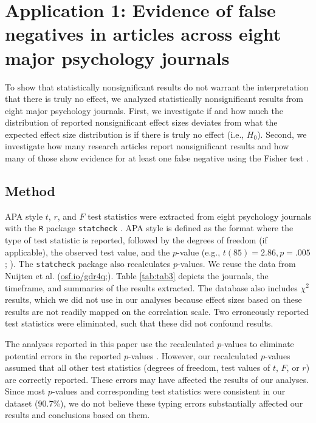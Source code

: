 \documentclass{article}
\begin{document}
\section*{Application 1: Evidence of false negatives in articles across eight major psychology journals}

To show that statistically nonsignificant results do not warrant the interpretation that there is truly no effect, we analyzed statistically nonsignificant results from eight major psychology journals. First, we investigate if and how much the distribution of reported nonsignificant effect sizes deviates from what the expected effect size distribution is if there is truly no effect (i.e., $H_0$). Second, we investigate how many research articles report nonsignificant results and how many of those show evidence for at least one false negative using the Fisher test \cite{Fisher1925-jl}.

\subsection*{Method}




APA style $t$, $r$, and $F$ test statistics were extracted from eight psychology journals with the \texttt{R} package \texttt{statcheck} \cite{Nuijten2015-od,Epskamp2015-ps}. APA style is defined as the format where the type of test statistic is reported, followed by the degrees of freedom (if applicable), the observed test value, and the $p$-value (e.g., $t(85)=2.86, p=.005$; \cite{American_Psychological_Association2010-qe}). The \texttt{statcheck} package also recalculates $p$-values. We reuse the data from Nuijten et al. (\url{osf.io/gdr4q};\cite{Nuijten2015-od}). Table \ref{tab:tab3} depicts the journals, the timeframe, and summaries of the results extracted. The database also includes $\chi^2$ results, which we did not use in our analyses because effect sizes based on these results are not readily mapped on the correlation scale. Two erroneously reported test statistics were eliminated, such that these did not confound results. 

The analyses reported in this paper use the recalculated $p$-values to eliminate potential errors in the reported $p$-values \cite{Bakker2011-hg,Nuijten2015-od}. However, our recalculated $p$-values assumed that all other test statistics (degrees of freedom, test values of $t$, $F$, or $r$) are correctly reported. These errors may have affected the results of our analyses. Since most $p$-values and corresponding test statistics were consistent in our dataset (90.7\%), we do not believe these typing errors substantially affected our results and conclusions based on them.
\end{document}
